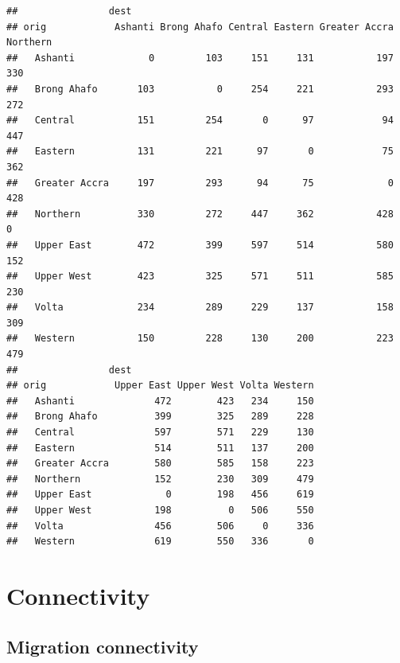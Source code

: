\documentclass[
]{book}
\begin{document}
\begin{verbatim}
##                dest
## orig            Ashanti Brong Ahafo Central Eastern Greater Accra Northern
##   Ashanti             0         103     151     131           197      330
##   Brong Ahafo       103           0     254     221           293      272
##   Central           151         254       0      97            94      447
##   Eastern           131         221      97       0            75      362
##   Greater Accra     197         293      94      75             0      428
##   Northern          330         272     447     362           428        0
##   Upper East        472         399     597     514           580      152
##   Upper West        423         325     571     511           585      230
##   Volta             234         289     229     137           158      309
##   Western           150         228     130     200           223      479
##                dest
## orig            Upper East Upper West Volta Western
##   Ashanti              472        423   234     150
##   Brong Ahafo          399        325   289     228
##   Central              597        571   229     130
##   Eastern              514        511   137     200
##   Greater Accra        580        585   158     223
##   Northern             152        230   309     479
##   Upper East             0        198   456     619
##   Upper West           198          0   506     550
##   Volta                456        506     0     336
##   Western              619        550   336       0
\end{verbatim}

\hypertarget{connectivity}{%
\section{Connectivity}\label{connectivity}}

\hypertarget{migration-connectivity}{%
\subsection{Migration connectivity}\label{migration-connectivity}}
\end{document}
